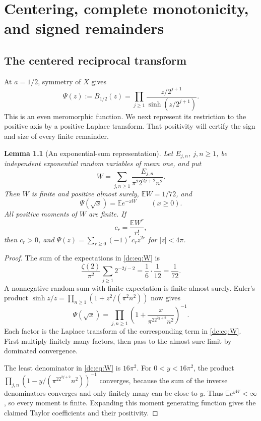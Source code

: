\documentclass[11pt,a4paper,oneside,openany]{book}
\numberwithin{equation}{chapter}
\newtheorem{lemma}[theorem]{Lemma}
\theoremstyle{definition}
\theoremstyle{remark}
\newcommand{\E}{\mathbb E}
\newcommand{\abs}[1]{\left\lvert #1\right\rvert}
\begin{document}
\chapter{Centering, complete monotonicity, and signed remainders}
\label{dc:sec:center}

\section{The centered reciprocal transform}
At $a=1/2$, symmetry of $X$ gives
\begin{equation}
 \Psi(z):=B_{1/2}(z)
 =\prod_{j\ge1}\frac{z/2^{j+1}}{\sinh(z/2^{j+1})}.
 \label{dc:eq:Psi}
\end{equation}
This is an even meromorphic function. We next represent its
restriction to the positive axis by a positive Laplace transform.
That positivity will certify the sign and size of every finite
remainder.

\begin{lemma}[An exponential-sum representation]
\label{dc:lem:W}
Let $E_{j,n}$, $j,n\ge1$, be independent exponential random variables
of mean one, and put
\begin{equation}
 W=\sum_{j,n\ge1}\frac{E_{j,n}}{\pi^2 2^{2j+2}n^2}.
 \label{dc:eq:W}
\end{equation}
Then $W$ is finite and positive almost surely,
$\E W=1/72$, and
\begin{equation}
 \boxed{\Psi(\sqrt{x})=\E e^{-xW}\qquad(x\ge0).}
 \label{dc:eq:Psi-Laplace}
\end{equation}
All positive moments of $W$ are finite. If
\begin{equation}
 c_r=\frac{\E W^r}{r!},
 \label{dc:eq:c-def}
\end{equation}
then $c_r>0$, and
$\Psi(z)=\sum_{r\ge0}(-1)^rc_rz^{2r}$ for $\abs z<4\pi$.
\end{lemma}
\begin{proof}
The sum of the expectations in \cref{dc:eq:W} is
\[
 \frac{\zeta(2)}{\pi^2}\sum_{j\ge1}2^{-2j-2}
 =\frac16\cdot\frac1{12}=\frac1{72}.
\]
A nonnegative random sum with finite expectation is finite almost
surely. Euler's product
$\sinh z/z=\prod_{n\ge1}(1+z^2/(\pi^2n^2))$ now gives
\[
 \Psi(\sqrt{x})
 =\prod_{j,n\ge1}\left(1+\frac{x}{\pi^22^{2j+2}n^2}\right)^{-1}.
\]
Each factor is the Laplace transform of the corresponding term in
\cref{dc:eq:W}. First multiply finitely many factors, then pass to the
almost sure limit by dominated convergence.

The least denominator in \cref{dc:eq:W} is $16\pi^2$.
For $0<y<16\pi^2$, the product
$\prod_{j,n}(1-y/(\pi^22^{2j+2}n^2))^{-1}$ converges, because the
sum of the inverse denominators converges and only finitely many
can be close to $y$. Thus $\E e^{yW}<\infty$, so every moment is
finite. Expanding this moment generating function gives the claimed
Taylor coefficients and their positivity.
\end{proof}
\end{document}
